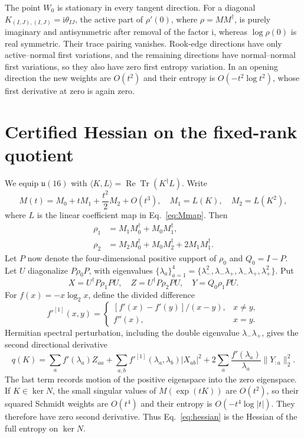 \documentclass[11pt]{article}
\newcommand{\Tr}{\operatorname{Tr}}
\newcommand{\ii}{\mathrm{i}}
\begin{document}
The point $W_0$ is stationary in every tangent direction.  For a diagonal
$K_{(I,J),(I,J)}=\ii\theta_{IJ}$, the active part of
$\rho'(0)$, where $\rho=MM^\dagger$, is purely imaginary and antisymmetric
after removal of the factor $\ii$, whereas $\log\rho(0)$ is real symmetric.
Their trace pairing vanishes.  Rook-edge directions have only
active--normal first variations, and the remaining directions have
normal--normal first variations, so they also have zero first entropy
variation.  In an opening direction the new weights are $O(t^2)$ and their
entropy is $O(-t^2\log t^2)$, whose first derivative at zero is again zero.

\section{Certified Hessian on the fixed-rank quotient}

We equip $\mathfrak u(16)$ with
$\langle K,L\rangle=\operatorname{Re}\Tr(K^\dagger L)$.  Write
\begin{equation}
 M(t)=M_0+tM_1+\frac{t^2}{2}M_2+O(t^3),
 \quad M_1=L(K),\quad M_2=L(K^2),
\end{equation}
where $L$ is the linear coefficient map in Eq.~\eqref{eq:Mmap}.  Then
\begin{align}
 \rho_1&=M_1M_0^\dagger+M_0M_1^\dagger,\\
 \rho_2&=M_2M_0^\dagger+M_0M_2^\dagger+2M_1M_1^\dagger.
 \label{eq:rho12}
\end{align}
Let $P$ now denote the four-dimensional positive support of $\rho_0$ and
$Q_0=I-P$.  Let $U$ diagonalize $P\rho_0P$, with eigenvalues
$\{\lambda_a\}_{a=1}^4=\{\lambda_-^2,\lambda_-\lambda_+,
\lambda_-\lambda_+,\lambda_+^2\}$.  Put
\begin{equation}
 X=U^\dagger P\rho_1PU,\quad Z=U^\dagger P\rho_2PU,
 \quad Y=Q_0\rho_1PU.
\end{equation}
For $f(x)=-x\log_2x$, define the divided difference
\begin{equation}
 f'^{[1]}(x,y)=
 \begin{cases}
 [f'(x)-f'(y)]/(x-y),&x\neq y,\\
 f''(x),&x=y.
 \end{cases}
\end{equation}
Hermitian spectral perturbation, including the double eigenvalue
$\lambda_-\lambda_+$, gives the second directional derivative
\begin{equation}
 q(K)=\sum_a f'(\lambda_a)Z_{aa}
 +\sum_{a,b}f'^{[1]}(\lambda_a,\lambda_b)|X_{ab}|^2
 +2\sum_a\frac{f'(\lambda_a)}{\lambda_a}\lVert Y_{:a}\rVert_2^2.
 \label{eq:hessian}
\end{equation}
The last term records motion of the positive eigenspace into the zero
eigenspace.  If $K\in\ker N$, the small singular values of $M(\exp(tK))$ are
$O(t^2)$, so their squared Schmidt weights are $O(t^4)$ and their entropy is
$O(-t^4\log|t|)$.  They therefore have zero second derivative.  Thus
Eq.~\eqref{eq:hessian} is the Hessian of the full entropy on $\ker N$.
\end{document}

